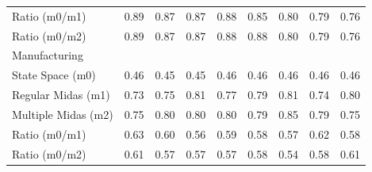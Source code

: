 \begin{table}[ht]
\begin{tabular}{lcccccccc}
Ratio (m0/m1) & 0.89 & 0.87 & 0.87 & 0.88 & 0.85 & 0.80 & 0.79 & 0.76 \\
Ratio (m0/m2) & 0.89 & 0.87 & 0.87 & 0.88 & 0.88 & 0.80 & 0.79 & 0.76 \\
\hline
Manufacturing &  &  &  &  &  &  &  &  \\
\hline
State Space (m0) & 0.46 & 0.45 & 0.45 & 0.46 & 0.46 & 0.46 & 0.46 & 0.46 \\
Regular Midas (m1) & 0.73 & 0.75 & 0.81 & 0.77 & 0.79 & 0.81 & 0.74 & 0.80 \\
Multiple Midas (m2) & 0.75 & 0.80 & 0.80 & 0.80 & 0.79 & 0.85 & 0.79 & 0.75 \\
Ratio (m0/m1) & 0.63 & 0.60 & 0.56 & 0.59 & 0.58 & 0.57 & 0.62 & 0.58 \\
Ratio (m0/m2) & 0.61 & 0.57 & 0.57 & 0.57 & 0.58 & 0.54 & 0.58 & 0.61 \\
\hline
\end{tabular}
\end{table}

